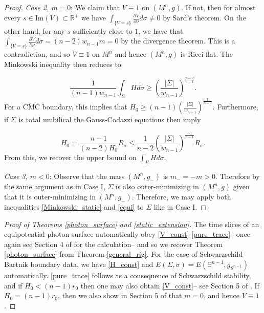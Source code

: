 \documentclass[12pt,twoside]{article}
\theoremstyle{plain}
\theoremstyle{definition}
\theoremstyle{remark}
\numberwithin{equation}{section}
\begin{document}
\begin{proof}
\textit{Case 2, $m=0$}: We claim that $V \equiv 1$ on $(M^{n},g)$. If not, then for almost every $s \in \text{Im}(V) \subset \mathbb{R}^{+}$ we have $\int_{\{V=s\}} \frac{\partial V}{\partial \nu} d\sigma \neq 0$ by Sard's theorem. On the other hand, for any $s$ sufficiently close to $1$, we have that $\int_{\{V=s\}} \frac{\partial V}{\partial \nu} d\sigma= (n-2)w_{n-1} m =0$ by the divergence theorem. This is a contradiction, and so $V \equiv 1$ on $M^{n}$ and hence $(M^{n},g)$ is Ricci flat. The Minkowski inequality then reduces to

\begin{equation*}
\frac{1}{(n-1)w_{n-1}}\int_{\Sigma} Hd\sigma \geq \left( \frac{|\Sigma|}{w_{n-1}} \right)^{\frac{n-2}{n-1}}.
\end{equation*}
For a CMC boundary, this implies that $H_{0} \geq (n-1) \left( \frac{|\Sigma|}{w_{n-1}} \right)^{\frac{1}{n-1}}$. Furthermore, if $\Sigma$ is total umbilical the Gauss-Codazzi equations then imply

\begin{equation*}
H_{0}= \frac{n-1}{(n-2)H_{0}} R_{\sigma} \leq \frac{1}{n-2} \left( \frac{|\Sigma|}{w_{n-1}} \right)^{\frac{-1}{n-1}} R_{\sigma}.
\end{equation*}
From this, we recover the upper bound on $\int_{\Sigma} H d\sigma$.

\textit{Case 3, $m <0$}: Observe that the mass $(M^{n},g_{-})$ is $m_{-}=-m > 0$. Therefore by the same argument as in Case I, $\Sigma$ is also outer-minimizing in $(M^{n},g)$ given that it is outer-minimizing in $(M^{n},g_{-})$. Therefore, we may apply both inequalities \eqref{Minkowski_static} and \eqref{equi} to $\Sigma$ like in Case I.
\end{proof}

\begin{proof}[Proof of Theorems \ref{photon_surface} and \ref{static_extension}]
The time slices of an equipotential photon surface automatically obey \eqref{V_const}-\eqref{pure_trace}-- once again see Section 4 of \cite{CG} for the calculation-- and so we recover Theorem \ref{photon_surface} from Theorem \ref{general_rig}. For the case of Schwarzschild Bartnik boundary data, we have \eqref{H_const} and $E(\Sigma,\sigma)=E(\mathbb{S}^{n-1},g_{S^{n-1}})$ automatically. \eqref{pure_trace} follows as a consequence of Schwarzschild stability, and if $H_{0} < (n-1) r_{0}$ then one may also obtain \eqref{V_const}-- see Section 5 of \cite{HW}. If $H_{0}=(n-1)r_{0}$, then we also show in Section 5 of \cite{HW} that $m=0$, and hence $V \equiv 1$.
\end{proof}
\end{document}
